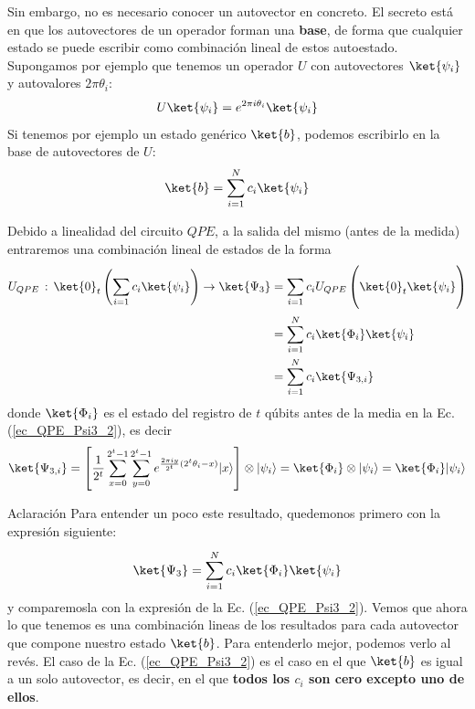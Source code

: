 \documentclass[a4paper,11pt]{book} %
\numberwithin{equation}{chapter}
\def\lc{\left[}
\def\rc{\right]}
\begin{document}
Sin embargo, no es necesario conocer un autovector en concreto. El secreto está en que los autovectores de un operador forman una \textbf{base}, de forma que cualquier estado se puede escribir como combinación lineal de estos autoestado. Supongamos por ejemplo que tenemos un operador $U$ con autovectores $\ket{\psi_i}$ y autovalores $2 \pi \theta_i$:
	\begin{equation} 
	U \ket{\psi_i} = e^{2 \pi i \theta_i} \ket{\psi_i}
	\end{equation}
Si tenemos por ejemplo un estado genérico $\ket{b}$, podemos escribirlo en la base de autovectores de $U$:
	\begin{equation} \label{ec_QPE_b_genérico}
	\ket{b} = \sum^N_{i=1} c_i \ket{\psi_i}
	\end{equation}

Debido a linealidad del circuito $QPE$, a la salida del mismo (antes de la medida) entraremos una combinación lineal de estados de la forma
	\begin{align*}
	U_{QPE}\, :\,\ket{0}_t \left(\sum_{i=1}c_i\ket{\psi_i}\right) \rightarrow \ket{\Psi_3} &= \sum_{i=1}c_i U_{QPE}\left(\ket{0}_t\ket{\psi_i} \rule{0mm}{7mm}\right)  \\ \rule{0mm}{7mm}
	& = \sum_{i=1}^N  c_i \ket{\Phi_i}\ket{\psi_i} \\ 
	& = \sum_{i=1}^N c_i \ket{\Psi_{3,i}}
	\end{align*}
donde $\ket{\Phi_i}$ es el estado del registro de $t$ qúbits antes de la media en la Ec. (\ref{ec_QPE_Psi3_2}), es decir
	\begin{equation}
	\ket{\Psi_{3,i}} = \lc \frac{1}{2^{t}} \sum_{x=0}^{2^t-1} \sum_{y=0}^{2^{t}-1}e^{\frac{2 \pi i y}{2^t} (2^t \theta_i - x)} |x\rangle \rc \otimes \vert\psi_i\rangle = \ket{\Phi_i} \otimes \vert\psi_i\rangle =  \ket{\Phi_i} \vert\psi_i\rangle
	\end{equation}

	\begin{mybox_blue}{Aclaración}	
	Para entender un poco este resultado, quedemonos primero con la expresión siguiente:
	\begin{equation} \label{ec_QPE_Psi_3_ci}
	\ket{\Psi_3}  = \sum_{i=1}^N  c_i \ket{\Phi_i}\ket{\psi_i} \\ \rule{0mm}{7mm}
	\end{equation}
	y comparemosla con la expresión de la Ec. (\ref{ec_QPE_Psi3_2}). Vemos que ahora lo que tenemos es una combinación lineas de los resultados para cada autovector que compone nuestro estado $\ket{b}$. Para entenderlo mejor, podemos verlo al revés. El caso de la Ec. (\ref{ec_QPE_Psi3_2}) es el caso en el que $\ket{b}$ es igual a un solo autovector, es decir, en el que \textbf{todos los $c_i$ son cero excepto uno de ellos}. 
	\end{mybox_blue}
\end{document}
